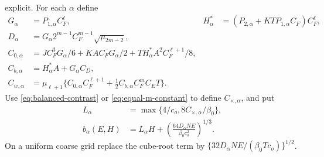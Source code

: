 explicit. For each $\alpha$ define
\begin{align}
 G_\alpha&=P_{1,\alpha}C_F^\ell,&
 H_\alpha^*&=(P_{2,\alpha}+KTP_{1,\alpha}C_F)C_F^\ell,\\
 D_\alpha&=G_\alpha 2^{m-1}C_F^{m-1}\sqrt{\mu_{2m-2}},\\
 C_{0,\alpha}&=JC_F^3G_\alpha/6+KAC_FG_\alpha/2
             +TH_\alpha^*A^2C_F^{\ell+1}/8,\\
 C_{b,\alpha}&=H_\alpha^*A+G_\alpha C_D,\\
 C_{w,\alpha}&=\mu_{\ell+1}\{C_{0,\alpha}C_F^{\ell+1}
                   +\tfrac12 C_{b,\alpha}C_F^mC_ET\}.
 \label{eq:polynomial-constants}
\end{align}
Use \eqref{eq:balanced-contrast} or \eqref{eq:equal-m-constant} to define
$C_{\times,\alpha}$, and put
\begin{align}
 L_\alpha&=\max\{4/c_o,8C_{\times,\alpha}/\beta_0\},\\
 b_\alpha(E,H)&=L_\alpha H+
       \left(\frac{64D_\alpha NE}{\beta_0c_o^2}\right)^{1/3}.
 \label{eq:hermite-coefficient-bound}
\end{align}
On a uniform coarse grid replace the cube-root term by
$\{32D_\alpha NE/(\beta_0Tc_o)\}^{1/2}$.

